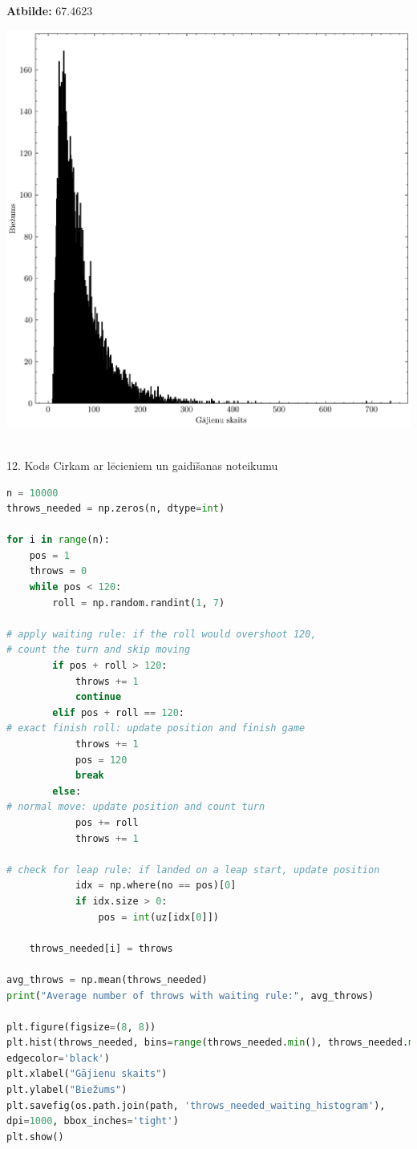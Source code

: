 \documentclass[12pt]{article}
\begin{document}
\textbf{Atbilde:} 67.4623

\begin{center}
    \includegraphics[width=0.8\linewidth]{throws_needed_waiting_histogram.png}
\end{center}

\\

12. Kods Cirkam ar lēcieniem un gaidīšanas noteikumu

\begin{lstlisting}[language=Python]
n = 10000
throws_needed = np.zeros(n, dtype=int)

for i in range(n):
    pos = 1
    throws = 0
    while pos < 120:
        roll = np.random.randint(1, 7)
        
# apply waiting rule: if the roll would overshoot 120, 
# count the turn and skip moving
        if pos + roll > 120:
            throws += 1
            continue
        elif pos + roll == 120:
# exact finish roll: update position and finish game
            throws += 1
            pos = 120
            break
        else:
# normal move: update position and count turn
            pos += roll
            throws += 1
            
# check for leap rule: if landed on a leap start, update position
            idx = np.where(no == pos)[0]
            if idx.size > 0:
                pos = int(uz[idx[0]])
                
    throws_needed[i] = throws

avg_throws = np.mean(throws_needed)
print("Average number of throws with waiting rule:", avg_throws)

plt.figure(figsize=(8, 8))
plt.hist(throws_needed, bins=range(throws_needed.min(), throws_needed.max()+2),
edgecolor='black')
plt.xlabel("Gājienu skaits")
plt.ylabel("Biežums")
plt.savefig(os.path.join(path, 'throws_needed_waiting_histogram'),
dpi=1000, bbox_inches='tight')
plt.show()
\end{lstlisting}
\end{document}
